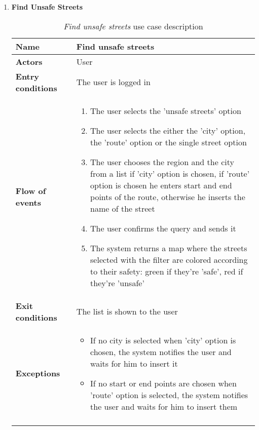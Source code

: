 \begin{enumerate}
			\item \textbf{Find Unsafe Streets}
				\begin{longtable}{p{0.25\linewidth}p{0.75\linewidth}}
					\toprule
					\textbf{Name} & \textbf{Find unsafe streets} \\
					\midrule
					\textbf{Actors} & User \\
					\midrule
					\textbf{Entry conditions} & The user is logged in \\
					\midrule
					\textbf{Flow of events} & 
					\begin{enumerate}
						\item The user selects the 'unsafe streets' option
						\item The user selects the either the 'city' option, the 'route' option or the single street option
						\item The user chooses the region and the city from a list if 'city' option is chosen, if 'route' option is chosen he enters start and end points of the route, otherwise he inserts the name of the street
						\item The user confirms the query and sends it
						\item The system returns a map where the streets selected with the filter are colored according to their safety: green if they're 'safe', red if they're 'unsafe'
					\end{enumerate} \\
					\midrule
					\textbf{Exit conditions} & The list is shown to the user\\
					\midrule
					\textbf{Exceptions} & 
					\begin{itemize}
						\item If no city is selected when 'city' option is chosen, the system notifies the user and waits for him to insert it
						\item If no start or end points are chosen when 'route' option is selected, the system notifies the user and waits for him to insert them
					\end{itemize} \\
					\bottomrule
					\caption{\emph{Find unsafe streets} use case description}
				\end{longtable}
		\end{enumerate}
			
